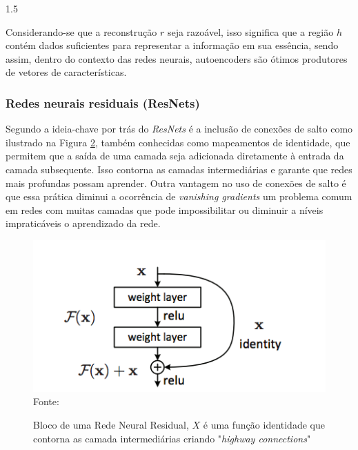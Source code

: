 \documentclass[a4paper,12pt,openright,oneside]{book}
\newenvironment{myenv}[1]
  {\begin{spacing}{#1}}
  {\end{spacing}}
\begin{document}
\begin{myenv}{1.5}
\begin{figure}[h]
						\label{fig:autoencoder}
					\end{figure}
				
					\par Considerando-se que a reconstrução $r$ seja razoável, isso significa que a região $h$  contém dados suficientes para representar a informação em sua essência, sendo assim, dentro do contexto das redes neurais, autoencoders são ótimos produtores de vetores de características.
					
					\subsubsection{Redes neurais residuais (ResNets)}
						\par Segundo \cite{DBLP:journals/corr/HeZRS15} a ideia-chave por trás do \textit{ResNets} é a inclusão de conexões de salto como ilustrado na Figura \ref{fig:residualblock}, também conhecidas como mapeamentos de identidade, que permitem que a saída de uma camada seja adicionada diretamente à entrada da camada subsequente. Isso contorna as camadas intermediárias e garante que redes mais profundas possam aprender. Outra vantagem no uso de conexões de salto é que essa prática diminui a ocorrência de \textit{vanishing gradients} um problema comum em redes com muitas camadas que pode impossibilitar ou diminuir a níveis impraticáveis o aprendizado da rede.
						
						\begin{figure}
							\centering
							\caption[bloco de uma Resnet]{Bloco de uma Rede Neural Residual, $X$ é uma função identidade que contorna as camada intermediárias criando "\textit{highway connections}"}
							\includegraphics[width=0.7\linewidth]{images/residualBlock}
							\\ Fonte: \cite{DBLP:journals/corr/HeZRS15}
							\label{fig:residualblock}
						\end{figure}
						

\end{myenv}
\end{document}
